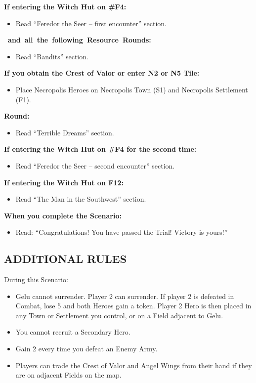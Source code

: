 \begin{multicols*}{2}
\textbf{If entering the Witch Hut on \#F4:}
\begin{itemize}
  \item Read ``Feredor the Seer -- first encounter'' section.
\end{itemize}

\textbf{\mbox{ and all the following Resource Rounds:}}
\begin{itemize}
  \item Read ``Bandits'' section.
\end{itemize}

\textbf{If you obtain the Crest of Valor or enter N2 or N5 Tile:}
\begin{itemize}
  \item Place Necropolis Heroes on Necropolis Town (S1) and Necropolis Settlement (F1).
\end{itemize}

\columnbreak
\textbf{ Round:}
\begin{itemize}
  \item Read ``Terrible Dreams'' section.
\end{itemize}

\textbf{If entering the Witch Hut on \#F4 for the second time:}
\begin{itemize}
  \item Read ``Feredor the Seer -- second encounter'' section.
\end{itemize}

\textbf{If entering the Witch Hut on F12:}
\begin{itemize}
  \item Read ``The Man in the Southwest'' section.
\end{itemize}

\textbf{When you complete the Scenario:}
\begin{itemize}
  \item Read: ``Congratulations! You have passed the Trial! Victory is yours!''
\end{itemize}

\subsection*{\MakeUppercase{Additional Rules}}

During this Scenario:

\begin{itemize}
  \item Gelu cannot surrender.
    Player 2 can surrender.
    If player 2 is defeated in Combat, lose 5  and both Heroes gain a  token.
    Player 2 Hero is then placed in any Town or Settlement you control, or on a Field adjacent to Gelu.
  \item You cannot recruit a Secondary Hero.
  \item Gain 2  every time you defeat an Enemy Army.
  \item Players can trade the Crest of Valor and Angel Wings from their hand if they are on adjacent Fields on the map.
\end{itemize}


\end{multicols*}
